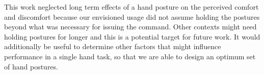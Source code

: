 \documentclass{sig-alternate-05-2015}
\begin{document}
This work neglected long term effects of a hand posture on the perceived comfort and discomfort because our envisioned usage did not assume holding the postures beyond what was necessary for issuing the command. Other contexts might need holding postures for longer and this is a potential target for future work. It would additionally be useful to determine other factors that might influence performance in a single hand task, so that we are able to design an optimum set of hand postures.

%

%
%

\end{document}
